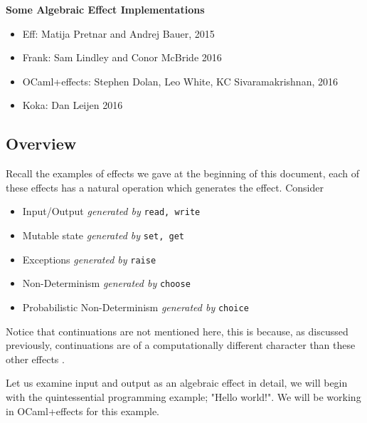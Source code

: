 \textbf{Some Algebraic Effect Implementations}
\begin{itemize}
    \item Eff: Matija Pretnar and Andrej Bauer,
        2015\cite{bauer2015programming}
    \item Frank: Sam Lindley and Conor McBride
        2016\cite{Lindley:2016vz}
    \item OCaml+effects: Stephen Dolan, Leo White, KC Sivaramakrishnan,
        2016\cite{ocamlplseff}
    \item Koka: Dan Leijen
        2016\cite{leijen:16}
\end{itemize}

\subsection{Overview}
\begin{example}
    Recall the examples of effects we gave at the beginning of this document,
    each of these effects has a natural operation which generates the effect.
    Consider
    \begin{itemize}
        \item Input/Output \textit{generated by} \texttt{read, write}
        \item Mutable state \textit{generated by} \texttt{set, get}
        \item Exceptions \textit{generated by} \texttt{raise}
        \item Non-Determinism \textit{generated by} \texttt{choose}
        \item Probabilistic Non-Determinism \textit{generated by} \texttt{choice}
    \end{itemize}
\end{example}

Notice that continuations are not mentioned here,
this is because, as discussed previously,
continuations are of a computationally different character
than these other effects
\cite{Plotkin:2002dw}\cite{hyland2007combining}.

Let us examine input and output as an algebraic effect in detail,
we will begin with the quintessential programming example; "Hello world!".
We will be working in OCaml+effects for this example.\\

